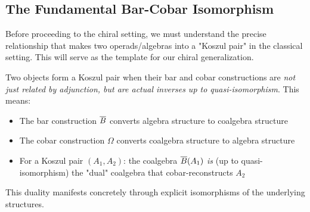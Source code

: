 \subsection{The Fundamental Bar-Cobar Isomorphism}

Before proceeding to the chiral setting, we must understand the precise relationship that makes two operads/algebras into a "Koszul pair" in the classical setting. This will serve as the template for our chiral generalization.

\begin{principle}
Two objects form a Koszul pair when their bar and cobar constructions are \emph{not just related by adjunction, but are actual inverses up to quasi-isomorphism}. This means:

\begin{itemize}
\item The bar construction $\overline{B}$ converts algebra structure to coalgebra structure
\item The cobar construction $\Omega$ converts coalgebra structure to algebra structure  
\item For a Koszul pair $(A_1, A_2)$: the coalgebra $\overline{B}(A_1)$ \emph{is} (up to quasi-isomorphism) the "dual" coalgebra that cobar-reconstructs $A_2$
\end{itemize}

This duality manifests concretely through explicit isomorphisms of the underlying structures.
\end{principle}

